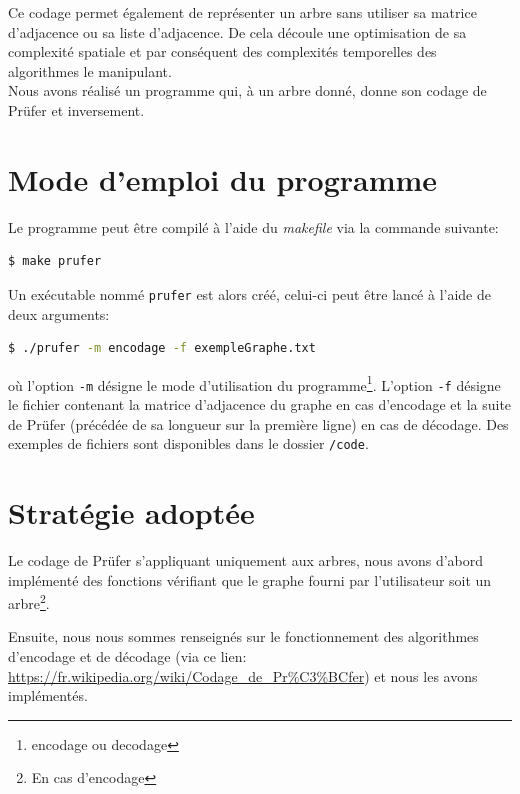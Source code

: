 \documentclass[a4paper, 11pt, oneside]{article}
\begin{document}

Ce codage permet également de représenter un arbre sans utiliser sa matrice d'adjacence ou sa liste d'adjacence. De cela découle une optimisation de sa complexité spatiale et par conséquent des complexités temporelles des algorithmes le manipulant.\\

Nous avons réalisé un programme qui, à un arbre donné, donne son codage de Prüfer et inversement.

\section{Mode d'emploi du programme}

Le programme peut être compilé à l'aide du \textit{makefile} via la commande suivante:

\begin{lstlisting}[language=bash]
$ make prufer
\end{lstlisting}

Un exécutable nommé \texttt{prufer} est alors créé, celui-ci peut être lancé à l'aide de deux arguments:

\begin{lstlisting}[language=bash]
$ ./prufer -m encodage -f exempleGraphe.txt
\end{lstlisting}

où l'option \texttt{-m} désigne le mode d'utilisation du programme\footnote{encodage ou decodage}. L'option \texttt{-f} désigne le fichier contenant la matrice d'adjacence du graphe en cas d'encodage et la suite de Prüfer (précédée de sa longueur sur la première ligne) en cas de décodage. Des exemples de fichiers sont disponibles dans le dossier \texttt{/code}.

\section{Stratégie adoptée}

Le codage de Prüfer s'appliquant uniquement aux arbres, nous avons d'abord implémenté des fonctions vérifiant que le graphe fourni par l'utilisateur soit un arbre\footnote{En cas d'encodage}.

Ensuite, nous nous sommes renseignés sur le fonctionnement des algorithmes d'encodage et de décodage (via ce lien: \url{https://fr.wikipedia.org/wiki/Codage_de_Pr%C3%BCfer}) et nous les avons implémentés.
\end{document}
